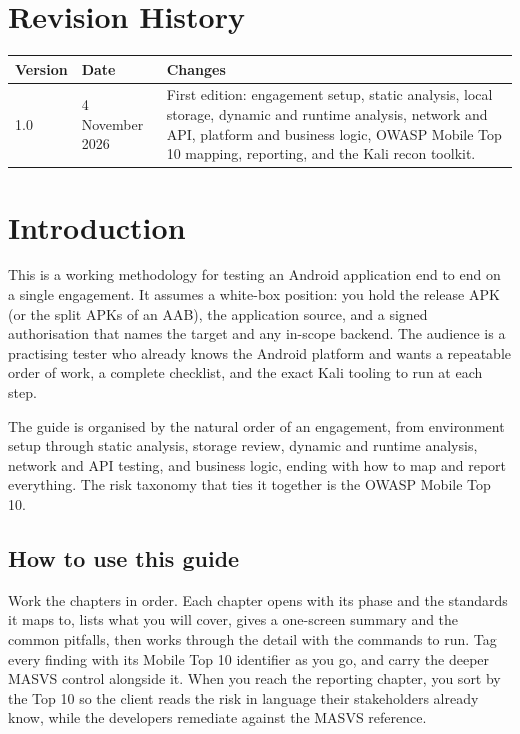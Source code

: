 \chapter*{Revision History}
\begin{tabularx}{\linewidth}{@{}llX@{}}
\toprule
\textbf{Version} & \textbf{Date} & \textbf{Changes}\\\midrule
1.0 & 4 November 2026 & First edition: engagement setup, static analysis, local storage, dynamic and runtime analysis, network and API, platform and business logic, OWASP Mobile Top 10 mapping, reporting, and the Kali recon toolkit.\\
\bottomrule
\end{tabularx}

\tableofcontents
\listoftables

\chapter{Introduction}

This is a working methodology for testing an Android application end to end on a single engagement. It assumes a white-box position: you hold the release APK (or the split APKs of an AAB), the application source, and a signed authorisation that names the target and any in-scope backend. The audience is a practising tester who already knows the Android platform and wants a repeatable order of work, a complete checklist, and the exact Kali tooling to run at each step.

The guide is organised by the natural order of an engagement, from environment setup through static analysis, storage review, dynamic and runtime analysis, network and API testing, and business logic, ending with how to map and report everything. The risk taxonomy that ties it together is the OWASP Mobile Top 10.

\section*{How to use this guide}
Work the chapters in order. Each chapter opens with its phase and the standards it maps to, lists what you will cover, gives a one-screen summary and the common pitfalls, then works through the detail with the commands to run. Tag every finding with its Mobile Top 10 identifier as you go, and carry the deeper MASVS control alongside it. When you reach the reporting chapter, you sort by the Top 10 so the client reads the risk in language their stakeholders already know, while the developers remediate against the MASVS reference.

